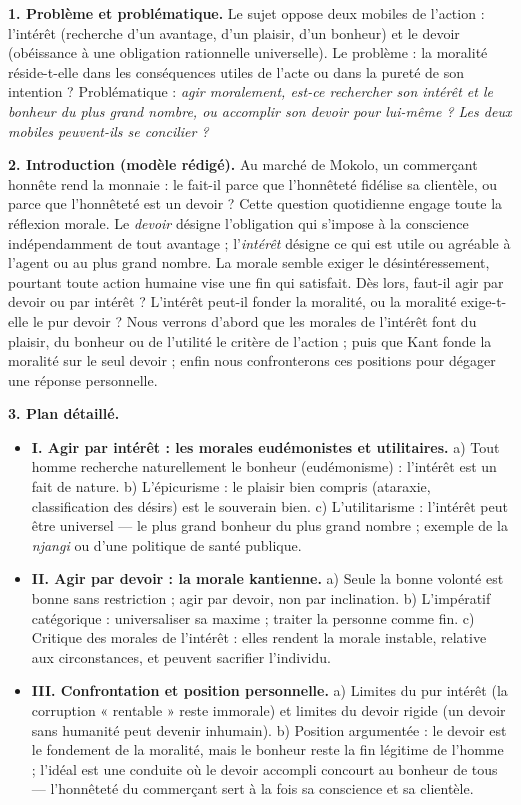\documentclass[11pt]{article}
\begin{document}
\begin{corrige}
\textbf{1. Problème et problématique.} Le sujet oppose deux mobiles de l'action : l'intérêt (recherche d'un avantage, d'un plaisir, d'un bonheur) et le devoir (obéissance à une obligation rationnelle universelle). Le problème : la moralité réside-t-elle dans les conséquences utiles de l'acte ou dans la pureté de son intention ? Problématique : \emph{agir moralement, est-ce rechercher son intérêt et le bonheur du plus grand nombre, ou accomplir son devoir pour lui-même ? Les deux mobiles peuvent-ils se concilier ?}

\textbf{2. Introduction (modèle rédigé).} Au marché de Mokolo, un commerçant honnête rend la monnaie : le fait-il parce que l'honnêteté fidélise sa clientèle, ou parce que l'honnêteté est un devoir ? Cette question quotidienne engage toute la réflexion morale. Le \emph{devoir} désigne l'obligation qui s'impose à la conscience indépendamment de tout avantage ; l'\emph{intérêt} désigne ce qui est utile ou agréable à l'agent ou au plus grand nombre. La morale semble exiger le désintéressement, pourtant toute action humaine vise une fin qui satisfait. Dès lors, faut-il agir par devoir ou par intérêt ? L'intérêt peut-il fonder la moralité, ou la moralité exige-t-elle le pur devoir ? Nous verrons d'abord que les morales de l'intérêt font du plaisir, du bonheur ou de l'utilité le critère de l'action ; puis que Kant fonde la moralité sur le seul devoir ; enfin nous confronterons ces positions pour dégager une réponse personnelle.

\textbf{3. Plan détaillé.}
\begin{itemize}
\item \textbf{I. Agir par intérêt : les morales eudémonistes et utilitaires.} a) Tout homme recherche naturellement le bonheur (eudémonisme) : l'intérêt est un fait de nature. b) L'épicurisme : le plaisir bien compris (ataraxie, classification des désirs) est le souverain bien. c) L'utilitarisme : l'intérêt peut être universel — le plus grand bonheur du plus grand nombre ; exemple de la \emph{njangi} ou d'une politique de santé publique.
\item \textbf{II. Agir par devoir : la morale kantienne.} a) Seule la bonne volonté est bonne sans restriction ; agir par devoir, non par inclination. b) L'impératif catégorique : universaliser sa maxime ; traiter la personne comme fin. c) Critique des morales de l'intérêt : elles rendent la morale instable, relative aux circonstances, et peuvent sacrifier l'individu.
\item \textbf{III. Confrontation et position personnelle.} a) Limites du pur intérêt (la corruption « rentable » reste immorale) et limites du devoir rigide (un devoir sans humanité peut devenir inhumain). b) Position argumentée : le devoir est le fondement de la moralité, mais le bonheur reste la fin légitime de l'homme ; l'idéal est une conduite où le devoir accompli concourt au bonheur de tous — l'honnêteté du commerçant sert à la fois sa conscience et sa clientèle.
\end{itemize}


\end{corrige}
\end{document}

